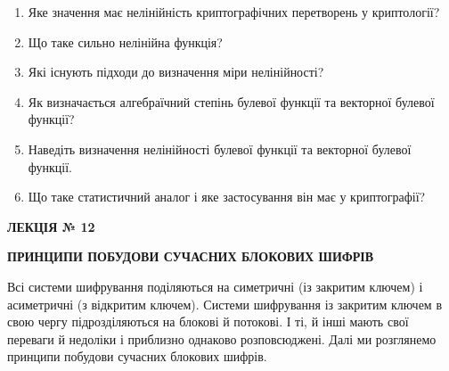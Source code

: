 \bigskip

\liststyleWWviiiNumi
\begin{enumerate}
\item Яке значення має нелінійність криптографічних перетворень у криптології?
\item Що таке сильно нелінійна функція?
\item Які існують підходи до визначення міри нелінійності?
\item Як визначається алгебраїчний степінь булевої функції та векторної булевої
функції?
\item Наведіть визначення нелінійності булевої функції та  векторної булевої
функції.
\item Що таке статистичний аналог і яке застосування він має у криптографії?
\end{enumerate}
{\bfseries
ЛЕКЦІЯ № 12}


\bigskip

{\centering\bfseries
ПРИНЦИПИ ПОБУДОВИ СУЧАСНИХ БЛОКОВИХ ШИФРІВ
\par}


\bigskip


\bigskip

Всі системи шифрування поділяються на симетричні (із закритим ключем) і
асиметричні (з відкритим ключем). Системи шифрування із закритим ключем в свою
чергу підрозділяються на блокові й потокові. І ті, й інші мають свої переваги й
недоліки і  приблизно однаково розповсюджені. Далі ми розглянемо принципи
побудови сучасних блокових шифрів.


